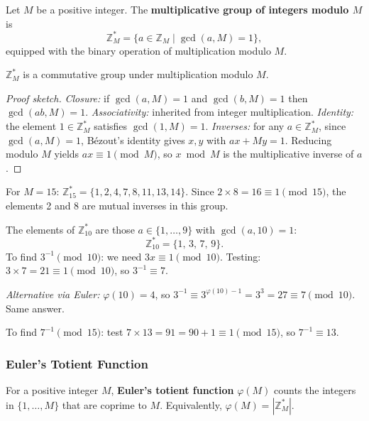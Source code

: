 \begin{definition}
Let $M$ be a positive integer. The \textbf{multiplicative group of integers modulo $M$} is
\[
\mathbb{Z}_M^* = \{ a \in \mathbb{Z}_M \mid \gcd(a, M) = 1 \},
\]
equipped with the binary operation of multiplication modulo $M$.
\end{definition}

\begin{lemma}
$\mathbb{Z}_M^*$ is a commutative group under multiplication modulo $M$.
\end{lemma}
\begin{proof}[Proof sketch]
\textit{Closure:} if $\gcd(a,M)=1$ and $\gcd(b,M)=1$ then $\gcd(ab,M)=1$.
\textit{Associativity:} inherited from integer multiplication.
\textit{Identity:} the element $1 \in \mathbb{Z}_M^*$ satisfies $\gcd(1,M)=1$.
\textit{Inverses:} for any $a \in \mathbb{Z}_M^*$, since $\gcd(a,M)=1$, Bézout's identity gives $x,y$ with $ax + My = 1$. Reducing modulo $M$ yields $ax \equiv 1 \pmod{M}$, so $x \bmod M$ is the multiplicative inverse of $a$.
\end{proof}

\begin{example}
For $M=15$: $\mathbb{Z}_{15}^* = \{1,2,4,7,8,11,13,14\}$. Since $2 \times 8 = 16 \equiv 1 \pmod{15}$, the elements 2 and 8 are mutual inverses in this group.
\end{example}

\begin{example}
The elements of $\mathbb{Z}_{10}^*$ are those $a \in \{1,\ldots,9\}$ with $\gcd(a,10)=1$:
\[
\mathbb{Z}_{10}^* = \{1,\, 3,\, 7,\, 9\}.
\]
To find $3^{-1} \pmod{10}$: we need $3x \equiv 1 \pmod{10}$. Testing: $3 \times 7 = 21 \equiv 1 \pmod{10}$, so $3^{-1} \equiv 7$.

\textit{Alternative via Euler:} $\varphi(10)=4$, so $3^{-1} \equiv 3^{\varphi(10)-1} = 3^3 = 27 \equiv 7 \pmod{10}$. Same answer.

To find $7^{-1} \pmod{15}$: test $7 \times 13 = 91 = 90 + 1 \equiv 1 \pmod{15}$, so $7^{-1} \equiv 13$.
\end{example}

\subsubsection*{Euler's Totient Function}

\begin{definition}
For a positive integer $M$, \textbf{Euler's totient function} $\varphi(M)$ counts the integers in $\{1,\ldots,M\}$ that are coprime to $M$. Equivalently, $\varphi(M) = |\mathbb{Z}_M^*|$.
\end{definition}


